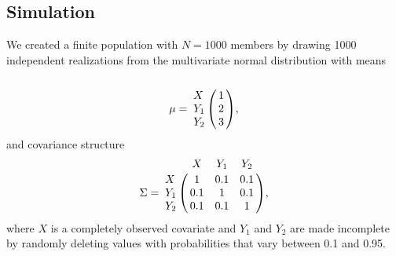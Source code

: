\documentclass[12pt, a4paper]{article}
\begin{document}
\subsection*{Simulation}
We created a finite population with $N = 1000$ members by drawing 1000 independent realizations from the multivariate normal distribution with means
\begin{equation}\label{meanmatrix}
\mu= \bordermatrix{&	 \cr
 X	&1	\cr
{ Y}_1	&2	\cr
{ Y}_2	&3	},
\end{equation}
and covariance structure
\begin{equation}\label{covmatrix}
\Sigma = \bordermatrix{& X &{ Y}_1 &{ Y}_2	 \cr
 X	&1	&0.1	&0.1\cr
{ Y}_1	&0.1	&1	&0.1\cr
{ Y}_2	&0.1	&0.1	&1},   
\end{equation}
where $ X$ is a completely observed covariate and ${ Y}_1$ and ${ Y}_2$ are made incomplete by randomly deleting values with probabilities that vary between 0.1 and 0.95. 
\end{document}
